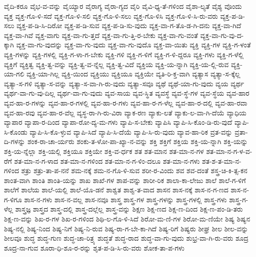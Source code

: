 {ವೈದಿ-ಕರೂ
ವೈಭ-ವ-ವನ್ನು
ವೈಯ್ಯಾರ
ವೈರಾಗ್ಯ
ವೈರಾ-ಗ್ಯದ
ವೈರಿ
ವೈವಿ-ಧ್ಯ-ತೆ-ಗಳಿಂದ
ವೈಶಾ-ಲ್ಯತೆ
ವೈಶ್ಯ
ವೊಂದು
ವ್ಯಕ್ತ
ವ್ಯಕ್ತ-ಗೊ-ಳಿ-ಸದೆ
ವ್ಯಕ್ತ-ಗೊ-ಳಿ-ಸಲಿ
ವ್ಯಕ್ತ-ಗೊ-ಳಿ-ಸಲು
ವ್ಯಕ್ತ-ಗೊ-ಳಿಸಿ
ವ್ಯಕ್ತ-ಗೊ-ಳಿ-ಸಿ-ರು-ವರು
ವ್ಯಕ್ತ-ಪ-ಡಿ-ಸಲು
ವ್ಯಕ್ತ-ಪ-ಡಿ-ಸಿ-ದಿರೋ
ವ್ಯಕ್ತ-ಪ-ಡಿ-ಸುವ
ವ್ಯಕ್ತ-ಪ-ಡಿ-ಸು-ವುದು
ವ್ಯಕ್ತ-ವಾ-ಗ-ತೊ-ಡ-ಗಿ-ದನು
ವ್ಯಕ್ತ-ವಾ-ಗಿದೆ
ವ್ಯಕ್ತ-ವಾ-ಗಿವೆ
ವ್ಯಕ್ತ-ವಾಗು
ವ್ಯಕ್ತ-ವಾ-ಗು-ತ್ತದೆ
ವ್ಯಕ್ತ-ವಾ-ಗು-ತ್ತಿ-ರ-ಬೇಕು
ವ್ಯಕ್ತ-ವಾ-ಗು-ವಂತೆ
ವ್ಯಕ್ತ-ವಾ-ಗು-ವು-ದ-ಕ್ಕಾಗಿ
ವ್ಯಕ್ತ-ವಾ-ಗು-ವುದನ್ನು
ವ್ಯಕ್ತ-ವಾ-ಗು-ವುದು
ವ್ಯಕ್ತ-ವಾ-ಗು-ವುದೊ
ವ್ಯಕ್ತ-ವಾ-ಯಿತು
ವ್ಯಕ್ತಿ
ವ್ಯಕ್ತಿ-ಗಳ
ವ್ಯಕ್ತಿ-ಗ-ಳಂತೆ
ವ್ಯಕ್ತಿ-ಗಳನ್ನು
ವ್ಯಕ್ತಿ-ಗಳಲ್ಲಿ
ವ್ಯಕ್ತಿ-ಗ-ಳಾ-ಗ-ಬೇಕು
ವ್ಯಕ್ತಿ-ಗಳಿ
ವ್ಯಕ್ತಿ-ಗ-ಳಿಗೆ
ವ್ಯಕ್ತಿ-ಗ-ಳಿ-ದ್ದರೂ
ವ್ಯಕ್ತಿ-ಗಳು
ವ್ಯಕ್ತಿ-ಗ-ಳೆಲ್ಲಿ
ವ್ಯಕ್ತಿಗೆ
ವ್ಯಕ್ತಿತ್ವ
ವ್ಯಕ್ತಿ-ತ್ವ-ವನ್ನು
ವ್ಯಕ್ತಿ-ತ್ವ-ವ-ನ್ನೆಲ್ಲ
ವ್ಯಕ್ತಿ-ತ್ವ-ವಿದೆ
ವ್ಯಕ್ತಿಯ
ವ್ಯಕ್ತಿ-ಯ-ನ್ನಾಗಿ
ವ್ಯಕ್ತಿ-ಯ-ಲ್ಲಿ-ರುವ
ವ್ಯಕ್ತಿ-ಯಾ-ಗಲಿ
ವ್ಯಕ್ತಿ-ಯಾ-ಗಿಲ್ಲ
ವ್ಯಕ್ತಿ-ಯಿಂದ
ವ್ಯಕ್ತಿಯು
ವ್ಯಕ್ತಿಯೂ
ವ್ಯಕ್ತಿಯೇ
ವ್ಯತಿ-ರಿ-ಕ್ತ-ವಾಗಿ
ವ್ಯತ್ಯಾಸ
ವ್ಯತ್ಯಾ-ಸ-ಕ್ಕೆಲ್ಲ
ವ್ಯತ್ಯಾ-ಸ-ಗಳಿ
ವ್ಯತ್ಯಾ-ಸ-ವನ್ನು
ವ್ಯತ್ಯಾ-ಸ-ವಾ-ಗಿ-ರು-ವುದು
ವ್ಯತ್ಯಾ-ಸವೂ
ವ್ಯಥೆ
ವ್ಯಥೆ-ಯಾ-ಗು-ವುದು
ವ್ಯಯ
ವ್ಯರ್ಥ
ವ್ಯರ್ಥ-ವಾ-ಗು-ವು-ದಿಲ್ಲ
ವ್ಯರ್ಥ-ವಾ-ಗು-ವುದು
ವ್ಯವ-ಸಾಯ
ವ್ಯವ-ಸ್ಥಿತ
ವ್ಯವಸ್ಥೆ
ವ್ಯವ-ಸ್ಥೆ-ಗಳ
ವ್ಯವ-ಸ್ಥೆಯ
ವ್ಯವ-ಹಾರ
ವ್ಯವ-ಹಾ-ರ-ಗಳನ್ನು
ವ್ಯವ-ಹಾ-ರ-ಗಳಲ್ಲಿ
ವ್ಯವ-ಹಾ-ರ-ಗಳು
ವ್ಯವ-ಹಾ-ರ-ಗ-ಳೆಲ್ಲ
ವ್ಯವ-ಹಾ-ರ-ದಲ್ಲಿ
ವ್ಯವ-ಹಾ-ರವಾ
ವ್ಯವ-ಹಾ-ರವು
ವ್ಯವ-ಹಾ-ರ-ವೆಲ್ಲ
ವ್ಯಸ್ಥ-ರಾ-ಗಿ-ರು-ವಿರಾ
ವ್ಯಾಕ-ರಣ
ವ್ಯಾಕು-ಲತೆ
ವ್ಯಾಕು-ಲ-ವಾ-ಗಿ-ದೆಯೆ
ವ್ಯಾಧಿಯ
ವ್ಯಾಪಾರ
ವ್ಯಾಪಾ-ರ-ದಿಂದ
ವ್ಯಾಪಾ-ರೋ-ದ್ಯ-ಮ-ಗಳು
ವ್ಯಾಪಿ-ಸ-ಬೇಕು
ವ್ಯಾಪಿಸಿ
ವ್ಯಾಪಿ-ಸಿ-ಕೊಂ-ಡಿ-ರು-ವುದೆ
ವ್ಯಾಪಿ-ಸಿ-ಕೊಂಡು
ವ್ಯಾಪಿ-ಸಿ-ಕೊ-ಳ್ಳುವ
ವ್ಯಾಪಿ-ಸಿದೆ
ವ್ಯಾಪಿ-ಸಿ-ದೆಯೆ
ವ್ಯಾಪಿ-ಸಿ-ರು-ವುದು
ವ್ಯಾವ-ಹಾ-ರಿಕ
ವ್ರತ-ವನ್ನು
ವ್ರತಾ-ದಿ-ಗಳನ್ನು
ಶಂಕ-ರಾ-ಚಾ-ರ್ಯರು
ಶಂಕು-ತ-ಳೋ-ಪಾ-ಖ್ಯಾ-ನ-ವನ್ನು
ಶಕ್ತಿ
ಶಕ್ತಿಗೆ
ಶಕ್ತಿಯ
ಶಕ್ತಿ-ಯ-ನ್ನಾಗಿ
ಶಕ್ತಿ-ಯನ್ನು
ಶಕ್ತಿ-ಯ-ನ್ನೆಲ್ಲಾ
ಶಕ್ತಿ-ಯಲ್ಲಿ
ಶಕ್ತಿಯೂ
ಶಕ್ತಿಯೇ
ಶಕ್ತಿ-ವ-ರ್ಧಕ
ಶತ
ಶತ-ಮಾನ
ಶತ-ಮಾ-ನ-ಗಳ
ಶತ-ಮಾ-ನ-ಗ-ಳ-ವ-ರೆಗೆ
ಶತ-ಮಾ-ನ-ಗ-ಳಾದ
ಶತ-ಮಾ-ನ-ಗಳಿಂದ
ಶತ-ಮಾ-ನ-ಗ-ಳಿಂ-ದಲೂ
ಶತ-ಮಾ-ನ-ಗಳು
ಶತ-ಶ-ತ-ಮಾ-ನ-ಗಳಿಂದ
ಶತ್ರು
ಶತ್ರು-ತಾ-ಪ-ನನೆ
ಶಮ-ನಕ್ಕೆ
ಶಮ-ನ-ಗೊ-ಳಿ-ಸುವ
ಶರೀ-ರ-ವಿಂದು
ಶವ
ಶವ-ದಂತೆ
ಶಸ್ತ್ರ-ಚಿ-ಕಿ-ತ್ಸ-ಕನ
ಶಾಂತ-ವಾಗಿ
ಶಾಂತಿ
ಶಾಂತಿ-ಯನ್ನು
ಶಾಖ
ಶಾಖೆ-ಗಳ
ಶಾಪ-ವನ್ನು
ಶಾರೀ-ರಿಕ
ಶಾಲಾ-ಕಾ-ಲೇಜು
ಶಾಲೆ
ಶಾಲೆ-ಗ-ಳಿಗೆ
ಶಾಲೆಗೆ
ಶಾಲೆಯ
ಶಾಲೆ-ಯಲ್ಲಿ
ಶಾಲೆ-ಯೊ-ಡನೆ
ಶಾಶ್ವತ
ಶಾಶ್ವ-ತ-ವಾದ
ಶಾಸನ
ಶಾಸ-ನಕ್ಕೆ
ಶಾಸ-ನ-ಗ-ಣದ
ಶಾಸ-ನ-ಗ-ಳಿಗೂ
ಶಾಸ-ನ-ಗಳು
ಶಾಸ-ನ-ವಲ್ಲ
ಶಾಸ-ನವೂ
ಶಾಸ್ತ್ರ
ಶಾಸ್ತ್ರ-ಗಳ
ಶಾಸ್ತ್ರ-ಗಳನ್ನು
ಶಾಸ್ತ್ರ-ಗಳಲ್ಲಿ
ಶಾಸ್ತ್ರ-ಗಳು
ಶಾಸ್ತ್ರ-ಗ-ಳೆಲ್ಲ
ಶಾಸ್ತ್ರಜ್ಞ
ಶಾಸ್ತ್ರದ
ಶಾಸ್ತ್ರ-ದಲ್ಲಿ
ಶಾಸ್ತ್ರ-ದಲ್ಲೆಲ್ಲ
ಶಾಸ್ತ್ರ-ವನ್ನು
ಶಿಕ್ಷಣ
ಶಿಕ್ಷ-ಣದ
ಶಿಕ್ಷ-ಣ-ದಿಂದ
ಶಿಕ್ಷ-ಣ-ಪಂ-ಡಿ-ತರು
ಶಿಕ್ಷ-ಣ-ವನ್ನು
ಶಿಖ-ರ-ಗಳ
ಶಿಖ-ರ-ಗಳಿಂದ
ಶಿಥಿ-ಲ-ಗೊ-ಳಿ-ಸಿದೆ
ಶಿರೋ-ಮ-ಣಿ-ಗಳ
ಶಿರೋ-ಮ-ಣಿಯೇ
ಶಿಷ್ಯ
ಶಿಷ್ಯನ
ಶಿಷ್ಯ-ನಲ್ಲಿ
ಶಿಷ್ಯ-ನಿಂದ
ಶಿಷ್ಯ-ನಿಗೆ
ಶಿಷ್ಯ-ನಿ-ರುವ
ಶಿಷ್ಯ-ರಾ-ಗ-ಬೇ-ಕಾ-ಗಿದೆ
ಶಿಷ್ಯ-ರಿಗೆ
ಶಿಷ್ಯರು
ಶೀಘ್ರ
ಶೀಲ
ಶೀಲ-ವನ್ನು
ಶೀಲವೂ
ಶುದ್ಧ
ಶುದ್ಧ-ಗುಣ
ಶುದ್ಧ-ಚಾ-ರಿತ್ರ್ಯ
ಶುದ್ಧತೆ
ಶುದ್ಧ-ರಾದ
ಶುದ್ಧ-ವಾ-ಗು-ವುದು
ಶುಭ್ರ-ವಾ-ಗಿ-ರು-ವರು
ಶೂದ್ರ
ಶೂದ್ರ-ನಾ-ಗುವ
ಶೂರಾ-ಧಿ-ಶೂ-ರ-ರನ್ನು
ಶೃತ-ಪ-ಡಿ-ಸಿ-ರು-ವರು
ಶೋಕ-ತಾ-ಪ-ಗಳು
}
